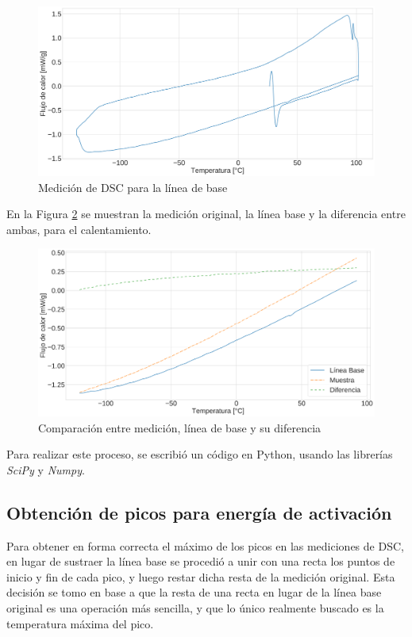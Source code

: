 \documentclass[12pt]{article}
\theoremstyle{definition}
\theoremstyle{remark}
\begin{document}
\begin{figure}[H]
	\centering
	\includegraphics[scale=0.1]{img/BaseLine}
	\caption{Medición de DSC para la línea de base}
	\label{BaseLine}
\end{figure}

En la Figura \ref{Comparison} se muestran la medición original, la línea base y la diferencia entre ambas, para el calentamiento.

\begin{figure}[H]
	\centering
	\includegraphics[scale=0.2]{img/NiPoorHeatingExample}
	\caption{Comparación entre medición, línea de base y su diferencia}
	\label{Comparison}
\end{figure}


Para realizar este proceso, se escribió un código en Python, usando las librerías \textit{SciPy} y \textit{Numpy}.

\subsection{Obtención de picos para energía de activación}

Para obtener en forma correcta el máximo de los picos en las mediciones de DSC, en lugar de sustraer la línea base se procedió a unir con una recta los puntos de inicio y fin de cada pico, y luego restar dicha resta de la medición original. Esta decisión se tomo en base a que la resta de una recta en lugar de la línea base original es una operación más sencilla, y que lo único realmente buscado es la temperatura máxima del pico.
\end{document}
